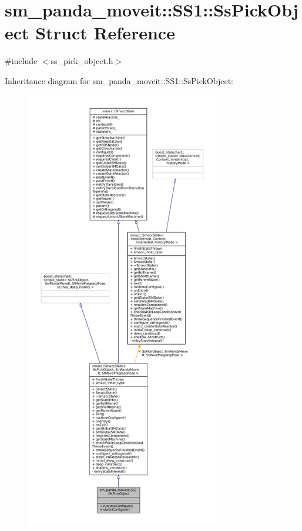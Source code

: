 \hypertarget{structsm__panda__moveit_1_1SS1_1_1SsPickObject}{}\section{sm\+\_\+panda\+\_\+moveit\+:\+:S\+S1\+:\+:Ss\+Pick\+Object Struct Reference}
\label{structsm__panda__moveit_1_1SS1_1_1SsPickObject}


{\ttfamily \#include $<$ss\+\_\+pick\+\_\+object.\+h$>$}



Inheritance diagram for sm\+\_\+panda\+\_\+moveit\+:\+:S\+S1\+:\+:Ss\+Pick\+Object\+:
\nopagebreak
\begin{figure}[H]
\begin{center}
\leavevmode
\includegraphics[height=550pt]{structsm__panda__moveit_1_1SS1_1_1SsPickObject__inherit__graph}
\end{center}
\end{figure}


